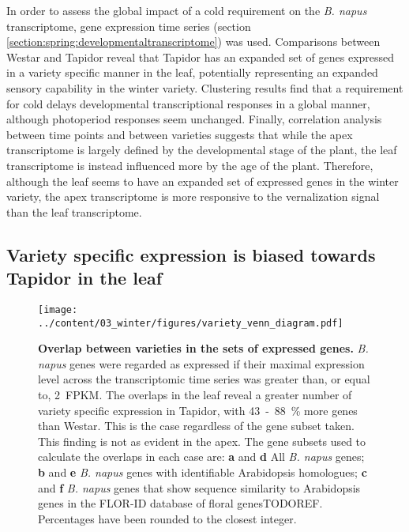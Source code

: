 \documentclass[12pt,]{book}
\begin{document}
In order to assess the global impact of a cold requirement on the
\emph{B. napus} transcriptome, gene expression time series (section
\ref{section:spring:developmentaltranscriptome}) was used. Comparisons
between Westar and Tapidor reveal that Tapidor has an expanded set of
genes expressed in a variety specific manner in the leaf, potentially
representing an expanded sensory capability in the winter variety.
Clustering results find that a requirement for cold delays developmental
transcriptional responses in a global manner, although photoperiod
responses seem unchanged. Finally, correlation analysis between time
points and between varieties suggests that while the apex transcriptome
is largely defined by the developmental stage of the plant, the leaf
transcriptome is instead influenced more by the age of the plant.
Therefore, although the leaf seems to have an expanded set of expressed
genes in the winter variety, the apex transcriptome is more responsive
to the vernalization signal than the leaf transcriptome.

\subsection{Variety specific expression is biased towards Tapidor in the
leaf}\label{section:winter:varspecexp}

\begin{figure}[htbp]
\centering
\texttt{[image: ../content/03\_winter/figures/variety\_venn\_diagram.pdf]}
\caption{\textbf{Overlap between varieties in the sets of expressed
genes.} \emph{B. napus} genes were regarded as expressed if their
maximal expression level across the transcriptomic time series was
greater than, or equal to, 2~FPKM. The overlaps in the leaf reveal a
greater number of variety specific expression in Tapidor, with
43~-~88~\% more genes than Westar. This is the case regardless of the
gene subset taken. This finding is not as evident in the apex. The gene
subsets used to calculate the overlaps in each case are: \textbf{a} and
\textbf{d} All \emph{B. napus} genes; \textbf{b} and \textbf{e} \emph{B.
napus} genes with identifiable Arabidopsis homologues; \textbf{c} and
\textbf{f} \emph{B. napus} genes that show sequence similarity to
Arabidopsis genes in the FLOR-ID database of floral genesTODOREF.
Percentages have been rounded to the closest
integer.}\label{figure:3xx:varietyvenn}
\end{figure}
\end{document}
